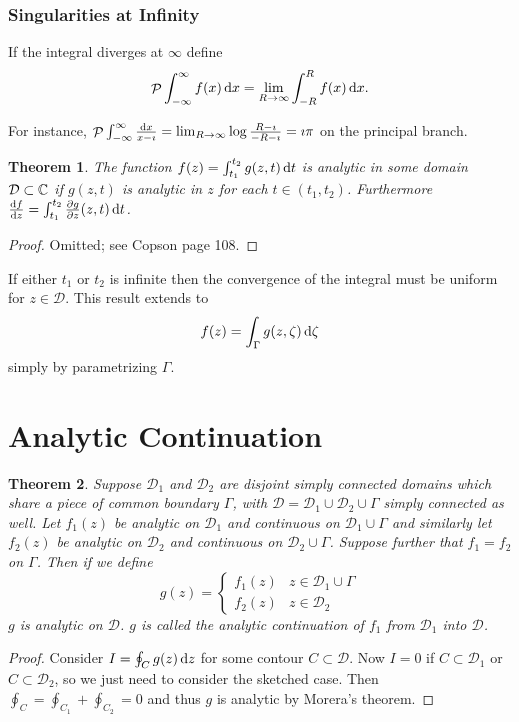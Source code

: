 \documentclass{notes}
\DeclareMathOperator{\Pv}{\mathcal{P}}
\newcommand{\D}{\mathcal{D}}
\theoremstyle{plain}
\newtheorem*{theorem}{Theorem}
\begin{document}
\subsubsection*{Singularities at Infinity}

If the integral diverges at $\infty$ define
\[
\Pv \int_{-\infty}^\infty f(x)\, \ud x =
\lim_{R \to \infty} \int_{-R}^R f(x)\, \ud x.
\]

For instance, $\Pv \int_{-\infty}^\infty \frac{\ud x}{x-\imath}
= \lim_{R \to \infty} \log \frac{R-\imath}{-R - \imath}
= \imath \pi$ on the principal branch.

\begin{theorem}
The function $f(z) = \int_{t_1}^{t_2} g(z,t)\, \mathrm{d} t$ is analytic in some
domain $\D \subset \C$ if $g(z,t)$ is analytic in $z$ for each $t
\in (t_1,t_2)$.  Furthermore $\frac{\mathrm{d} f}{\mathrm{d} z} = \int_{t_1}^{t_2}
\frac{\partial g}{\partial z}(z,t)\, \mathrm{d} t$.
\end{theorem}

\begin{proof}
Omitted; see Copson page 108.
\end{proof}

If either $t_1$ or $t_2$ is infinite then the convergence of the integral
must be uniform for $z \in \D$.  This result extends to
\[
f(z) = \int_\Gamma g(z,\zeta)\, \mathrm{d}\zeta
\]
simply by parametrizing $\Gamma$.

\section{Analytic Continuation}

\begin{theorem}
Suppose $\D_1$ and $\D_2$ are disjoint simply connected domains which share
a piece of common boundary $\Gamma$, with $\D = \D_1 \cup \D_2 \cup \Gamma$
simply connected as well.  Let $f_1(z)$ be analytic on $\D_1$ and continuous
on $\D_1 \cup \Gamma$ and similarly let $f_2(z)$ be analytic on $\D_2$ and
continuous on $\D_2 \cup \Gamma$.  Suppose further that $f_1 = f_2$ on
$\Gamma$.  Then if we define
\[
g(z) = \begin{cases} f_1(z) & z \in \D_1 \cup \Gamma \\
f_2(z) & z \in \D_2
\end{cases}
\]
$g$ is analytic on $\D$.  $g$ is called the analytic continuation of $f_1$
from $\D_1$ into $\D$.
\end{theorem}

\begin{proof}
Consider $I = \oint_C g(z)\, \mathrm{d} z$ for some contour $C \subset \D$.
Now $I=0$ if $C \subset \D_1$ or $C \subset \D_2$, so we just need to
consider the sketched case.  Then $\oint_C = \oint_{C_1} + \oint_{C_2} = 0$
and thus $g$ is analytic by Morera's theorem.
\end{proof}
\end{document}
